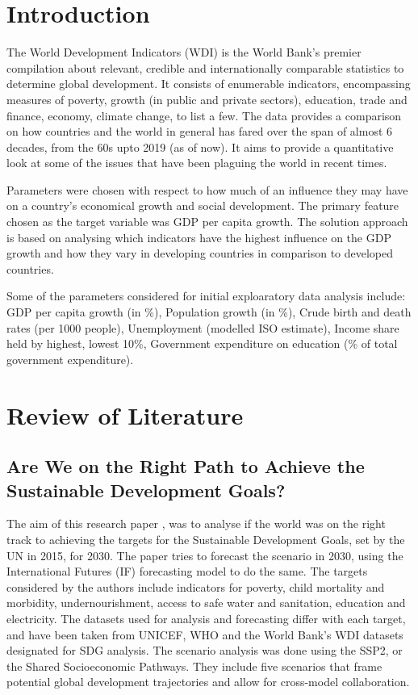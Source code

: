 \documentclass[conference]{IEEEtran}
\begin{document}
\section{Introduction}
The World Development Indicators (WDI) is the World Bank’s premier compilation 
about relevant, credible and internationally comparable statistics to determine 
global development. It consists of enumerable indicators, encompassing measures 
of poverty, growth (in public and private sectors), education, trade and finance, 
economy, climate change, to list a few. The data provides a comparison on how 
countries and the world in general has fared over the span of almost 6 decades, 
from the 60s upto 2019 (as of now). It aims to provide a quantitative look at 
some of the issues that have been plaguing the world in recent times.

Parameters were chosen with respect to how much of an influence they may have 
on a country's economical growth and social development. The primary feature chosen
as the target variable was GDP per capita growth. The solution approach is based on 
analysing which indicators have the highest influence on the GDP growth and how they 
vary in developing countries in comparison to developed countries.

Some of the parameters considered for initial exploaratory data analysis include: 
GDP per capita growth (in \%), 
Population growth (in \%), 
Crude birth and death rates (per 1000 people), 
Unemployment (modelled ISO estimate), 
Income share held by highest, lowest 10\%, 
Government expenditure on education (\% of total government expenditure).



\section{Review of Literature}

\subsection{Are We on the Right Path to Achieve the Sustainable Development Goals?}
The aim of this research paper \cite{SDG}, was to analyse if the world was on the right track to achieving the targets for the Sustainable Development Goals, set by the UN in 2015, for 2030. The paper tries to forecast the scenario in 2030, using the International Futures (IF) forecasting model to do the same. The targets considered by the authors include indicators for poverty, child mortality and morbidity, undernourishment, access to safe water and sanitation, education and electricity. The datasets used for analysis and forecasting differ with each target, and have been taken from UNICEF, WHO and the World Bank's WDI datasets designated for SDG analysis.\newline
The scenario analysis was done using the SSP2, or the Shared Socioeconomic Pathways. They include five scenarios that frame potential global development trajectories and allow for cross-model collaboration.
\end{document}
